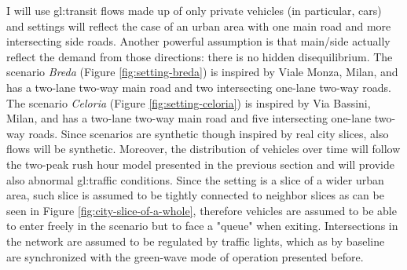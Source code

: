 I will use \gls{gl:transit} flows made up of only private vehicles (in particular, cars) and settings will reflect the case of an urban area with one main road and more intersecting side roads. Another powerful assumption is that main/side actually reflect the demand from those directions: there is no hidden disequilibrium.
The scenario \textit{Breda} (Figure \ref{fig:setting-breda}) is inspired by Viale Monza, Milan, and has a two-lane two-way main road and two intersecting one-lane two-way roads.
The scenario \textit{Celoria} (Figure \ref{fig:setting-celoria}) is inspired by Via Bassini, Milan, and has a two-lane two-way main road and five intersecting one-lane two-way roads.
Since scenarios are synthetic though inspired by real city slices, also flows will be synthetic. Moreover, the distribution of vehicles over time will follow the two-peak rush hour model presented in the previous section and will provide also abnormal \gls{gl:traffic} conditions. Since the setting is a slice of a wider urban area, such slice is assumed to be tightly connected to neighbor slices as can be seen in Figure \ref{fig:city-slice-of-a-whole}, therefore vehicles are assumed to be able to enter freely in the scenario but to face a "queue" when exiting. Intersections in the network are assumed to be regulated by traffic lights, which as by baseline are synchronized with the green-wave mode of operation presented before.

